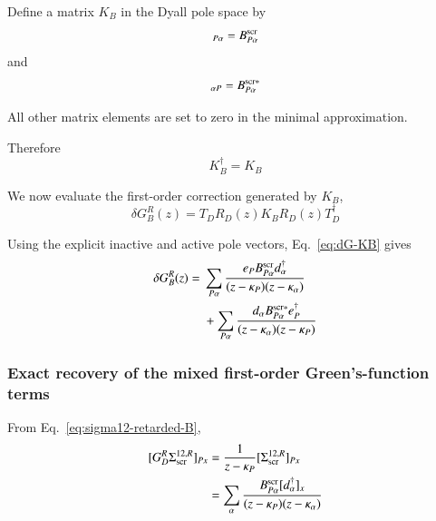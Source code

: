\documentclass[aip,jcp,reprint,noshowkeys,superscriptaddress]{revtex4-1}
\begin{document}
Define a matrix $K_B$ in the Dyall pole space by
\begin{equation}
  [K_B]_{P\alpha}
  =
  B_{P\alpha}^{\rm scr}
  \label{eq:KB-Palpha}
\end{equation}
and
\begin{equation}
  [K_B]_{\alpha P}
  =
  B_{P\alpha}^{{\rm scr}*}
  \label{eq:KB-alphaP}
\end{equation}

All other matrix elements are set to zero in the minimal approximation.

Therefore
\begin{equation}
  K_B^\dagger=K_B
  \label{eq:KB-Hermitian}
\end{equation}

We now evaluate the first-order correction generated by $K_B$,
\begin{equation}
  \delta G_B^R(z)
  =
  T_DR_D(z)
  K_B
  R_D(z)T_D^\dagger
  \label{eq:dG-KB}
\end{equation}

Using the explicit inactive and active pole vectors,
Eq.~\eqref{eq:dG-KB} gives
\begin{equation}
  \begin{aligned}
  \delta G_B^R(z)
  ={}&
  \sum_{P\alpha}
  \frac{
    e_P
    B_{P\alpha}^{\rm scr}
    d_\alpha^\dagger
  }{
    (z-\kappa_P)
    (z-\kappa_\alpha)
  }
  \\
  &+
  \sum_{P\alpha}
  \frac{
    d_\alpha
    B_{P\alpha}^{{\rm scr}*}
    e_P^\dagger
  }{
    (z-\kappa_\alpha)
    (z-\kappa_P)
  }
  \end{aligned}
  \label{eq:dG-KB-explicit}
\end{equation}


\subsubsection{Exact recovery of the mixed first-order Green's-function terms}

From Eq.~\eqref{eq:sigma12-retarded-B},
\begin{equation}
  \begin{aligned}
  [G_D^R\Sigma_{\rm scr}^{12,R}]_{Px}
  &=
  \frac{1}{z-\kappa_P}
  [\Sigma_{\rm scr}^{12,R}]_{Px}
  \\
  &=
  \sum_\alpha
  \frac{
    B_{P\alpha}^{\rm scr}
    [d_\alpha^\dagger]_x
  }{
    (z-\kappa_P)
    (z-\kappa_\alpha)
  }
  \end{aligned}
\end{equation}
\end{document}
